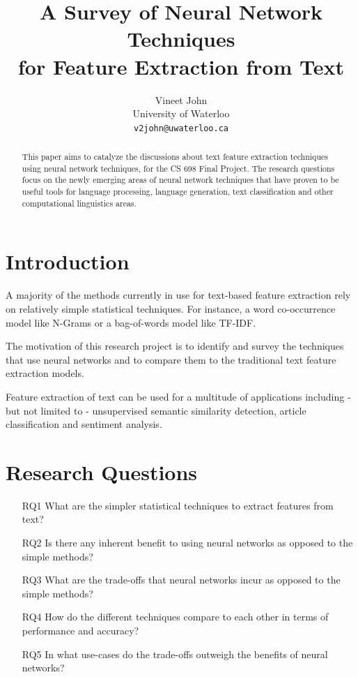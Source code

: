 \documentclass[11pt,a4paper]{article}
\title{A Survey of Neural Network Techniques\\for Feature Extraction from Text}
\author{
  Vineet John \\
  University of Waterloo \\
  {\tt v2john@uwaterloo.ca} \\
}
\date{}
\begin{document}
\maketitle


\begin{abstract}
  This paper aims to catalyze the discussions about text feature extraction techniques using neural network techniques, for the CS 698 Final Project. The research questions focus on the newly emerging areas of neural network techniques that have proven to be useful tools for language processing, language generation, text classification and other computational linguistics areas.
\end{abstract}


\section{Introduction} %
\label{sec:introduction}

  A majority of the methods currently in use for text-based feature extraction rely on relatively simple statistical techniques. For instance, a word co-occurrence model like N-Grams or a bag-of-words model like TF-IDF.

  The motivation of this research project is to identify and survey the techniques that use neural networks and to compare them to the traditional text feature extraction models.

  Feature extraction of text can be used for a multitude of applications including - but not limited to - unsupervised semantic similarity detection, article classification and sentiment analysis.


\section{Research Questions} %
\label{sec:research_questions}

  \begin{itemize}
    \item [RQ1] What are the simpler statistical techniques to extract features from text?
    \item [RQ2] Is there any inherent benefit to using neural networks as opposed to the simple methods?
    \item [RQ3] What are the trade-offs that neural networks incur as opposed to the simple methods?
    \item [RQ4] How do the different techniques compare to each other in terms of performance and accuracy?
    \item [RQ5] In what use-cases do the trade-offs outweigh the benefits of neural networks?
  \end{itemize}
\end{document}
